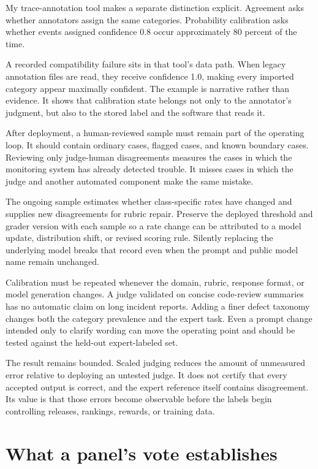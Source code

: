 My trace-annotation tool makes a separate distinction explicit. Agreement asks whether annotators assign the same categories. Probability calibration asks whether events assigned confidence 0.8 occur approximately 80 percent of the time.

A recorded compatibility failure sits in that tool's data path. When legacy annotation files are read, they receive confidence 1.0, making every imported category appear maximally confident. The example is narrative rather than evidence. It shows that calibration state belongs not only to the annotator's judgment, but also to the stored label and the software that reads it.

After deployment, a human-reviewed sample must remain part of the operating loop. It should contain ordinary cases, flagged cases, and known boundary cases. Reviewing only judge-human disagreements measures the cases in which the monitoring system has already detected trouble. It misses cases in which the judge and another automated component make the same mistake.

The ongoing sample estimates whether class-specific rates have changed and supplies new disagreements for rubric repair. Preserve the deployed threshold and grader version with each sample so a rate change can be attributed to a model update, distribution shift, or revised scoring rule. Silently replacing the underlying model breaks that record even when the prompt and public model name remain unchanged.

Calibration must be repeated whenever the domain, rubric, response format, or model generation changes. A judge validated on concise code-review summaries has no automatic claim on long incident reports. Adding a finer defect taxonomy changes both the category prevalence and the expert task. Even a prompt change intended only to clarify wording can move the operating point and should be tested against the held-out expert-labeled set.

The result remains bounded. Scaled judging reduces the amount of unmeasured error relative to deploying an untested judge. It does not certify that every accepted output is correct, and the expert reference itself contains disagreement. Its value is that those errors become observable before the labels begin controlling releases, rankings, rewards, or training data.

\hypertarget{what-a-panels-vote-establishes}{%
\section{What a panel's vote establishes}\label{what-a-panels-vote-establishes}}

